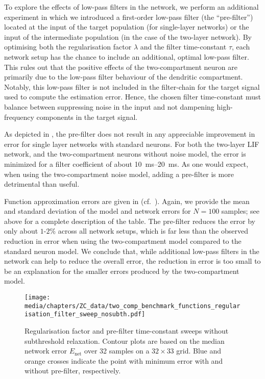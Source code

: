 To explore the effects of low-pass filters in the network, we perform an additional experiment in which we introduced a first-order low-pass filter (the \enquote{pre-filter}) located at the input of the target population (for single-layer networks) or the input of the intermediate population (in the case of the two-layer network).
By optimising both the regularisation factor $\lambda$ and the filter time-constant $\tau$, each network setup has the chance to include an additional, optimal low-pass filter.
This rules out that the positive effects of the two-compartment neuron are primarily due to the low-pass filter behaviour of the dendritic compartment.
Notably, this low-pass filter is not included in the filter-chain for the target signal used to compute the estimation error.
Hence, the chosen filter time-constant must balance between suppressing noise in the input and not dampening high-frequency components in the target signal.

As depicted in , the pre-filter does not result in any appreciable improvement in error for single layer networks with standard \LIF neurons.
For both the two-layer LIF network, and the two-compartment \LIF neurons without noise model, the error is minimized for a filter coefficient of about \SIrange{10}{20}{\milli\second}.
As one would expect, when using the two-compartment \LIF noise model, adding a pre-filter is more detrimental than useful.

Function approximation errors are given in (cf.~).
Again, we provide the mean and standard deviation of the model and network errors for $N = 100$ samples; see above for a complete description of the table.
The pre-filter reduces the error by only about $1$-$2\%$ across all network setups, which is far less than the observed reduction in error when using the two-compartment model compared to the standard \LIF neuron model.
We conclude that, while additional low-pass filters in the network can help to reduce the overall error, the reduction in error is too small to be an explanation for the smaller errors produced by the two-compartment model.

\begin{figure}[p]
	\texttt{[image: media/chapters/ZC\_data/two\_comp\_benchmark\_functions\_regularisation\_filter\_sweep\_nosubth.pdf]}
	\caption[Regularisation factor and pre-filter time-constant sweeps without subthreshold relaxation]{Regularisation factor and pre-filter time-constant sweeps without subthreshold relaxation. Contour plots are based on the median network error $E_\mathrm{net}$ over 32 samples on a $32 \times 33$ grid. Blue and orange crosses indicate the point with minimum error with and without pre-filter, respectively.}
	\label{fig:regularization_parameter_sweep_nosubth}
\end{figure}

